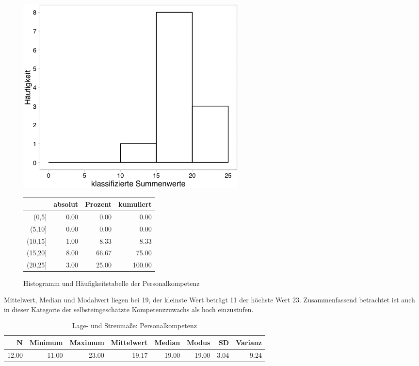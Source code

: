 \documentclass[12pt, bibliography=totoc]{scrartcl}
\begin{document}
\begin{figure}[H]
\begin{minipage}{.5\linewidth}
\includegraphics[width=0.8\linewidth]{Anhang/PKHistnn.png}

\label{PK}
\end{minipage}
\begin{minipage}{.5\linewidth}
\centering
\raisebox{\depth}
{\begin{tabular}{rrrr}
  \hline
 & absolut & Prozent & kumuliert \\
  \hline
(0,5] & 0.00 & 0.00 & 0.00 \\
  (5,10] & 0.00 & 0.00 & 0.00 \\
  (10,15] & 1.00 & 8.33 & 8.33 \\
  (15,20] & 8.00 & 66.67 & 75.00 \\
  (20,25] & 3.00 & 25.00 & 100.00 \\
   \hline
\end{tabular}

}
\label{tab:defis}
\end{minipage}
\caption{Histogramm und Häufigkeitstabelle der Personalkompetenz}
\label{fig:PK}
\end{figure}

Mittelwert, Median und Modalwert liegen bei 19, der kleinste Wert
beträgt 11 der höchste Wert 23. Zusammenfassend betrachtet ist auch in
dieser Kategorie der selbsteingeschätzte Kompetenzzuwachs als hoch
einzustufen.

\begin{table}[H]
\centering
\caption{Lage- und Streumaße: Personalkompetenz}
\label{tab:lPK}
\begin{tabular}{rrrrrrrr}
  \hline
  N & Minimum & Maximum & Mittelwert & Median & Modus & SD & Varianz \\
  \hline
  12.00 & 11.00 & 23.00 & 19.17 & 19.00 & 19.00 & 3.04 & 9.24 \\
   \hline
\end{tabular}
\end{table}
\end{document}
